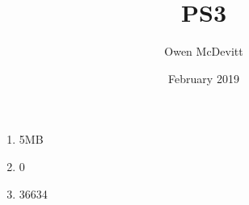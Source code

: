 \documentclass{article}
\title{PS3}
\author{Owen McDevitt}
\date{February 2019}
\begin{document}
\maketitle

\begin{enumerate}
    \item 5MB
    \item 0
    \item 36634
\end{enumerate}
\end{document}
